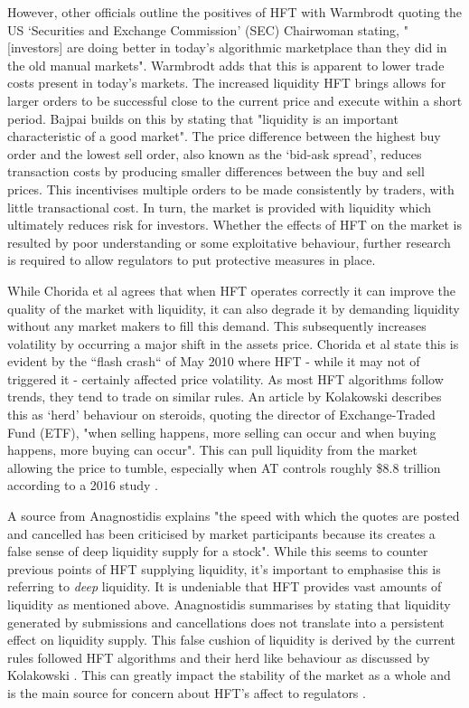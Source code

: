 However, other officials outline the positives of HFT with Warmbrodt \cite{ART:Warmbrodt:2016} quoting the US `Securities and Exchange Commission' (SEC) Chairwoman stating, "[investors] are doing better in today's algorithmic marketplace than they did in the old manual markets". Warmbrodt adds that this is apparent to lower trade costs present in today's markets. The increased liquidity HFT brings allows for larger orders to be successful close to the current price and execute within a short period.  Bajpai \cite{WEB:Bajpai:0001} builds on this by stating that "liquidity is an important characteristic of a good market". The price difference between the highest buy order and the lowest sell order, also known as the `bid-ask spread', reduces transaction costs by producing smaller differences between the buy and sell prices. This incentivises multiple orders to be made consistently by traders, with little transactional cost. In turn, the market is provided with liquidity which ultimately reduces risk for investors. Whether the effects of HFT on the market is resulted by poor understanding or some exploitative behaviour, further research is required to allow regulators to put protective measures in place. 

While Chorida et al \cite{REPORT:ChordiaEtAl:2013} agrees that when HFT operates correctly it can improve the quality of the market with liquidity, it can also degrade it by demanding liquidity without any market makers to fill this demand. This subsequently increases volatility by occurring a major shift in the assets price. Chorida et al state this is evident by the ``flash crash`` of May 2010 where HFT - while it may not of triggered it - certainly affected price volatility. As most HFT algorithms follow trends, they tend to trade on similar rules. An article by Kolakowski \cite{ART:Kolakowski:2018} describes this as `herd' behaviour on steroids, quoting the director of Exchange-Traded Fund (ETF), "when selling happens, more selling can occur and when buying happens, more buying can occur". This can pull liquidity from the market allowing the price to tumble, especially when AT controls roughly \$8.8 trillion according to a 2016 study \cite{ART:Kolakowski:2018}. 

A source from Anagnostidis \cite{UNPUB:Anagnostidis:2017} explains "the speed with which the quotes are posted and cancelled has been criticised by market participants because its creates a false sense of deep liquidity supply for a stock". While this seems to counter previous points of HFT supplying liquidity, it's important to emphasise this is referring to \textit{deep} liquidity. It is undeniable that HFT provides vast amounts of liquidity as mentioned above. Anagnostidis summarises by stating that liquidity generated by submissions and cancellations does not translate into a persistent effect on liquidity supply. This false cushion of liquidity is derived by the current rules followed HFT algorithms and their herd like behaviour as discussed by Kolakowski \cite{ART:Kolakowski:2018}. This can greatly impact the stability of the market as a whole and is the main source for concern about HFT's affect to regulators \cite{WEB:Kaufman:2016}.   

